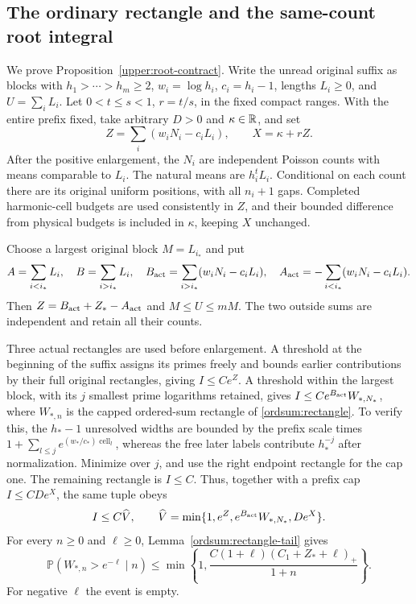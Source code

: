 \subsection{The ordinary rectangle and the same-count root integral}
\label{updetail:ordinary-root}
We prove Proposition~\ref{upper:root-contract}. Write the unread original
suffix as blocks with $h_1>\cdots>h_m\geq2$, $w_i=\log h_i$,
$c_i=h_i-1$, lengths $L_i\geq0$, and $U=\sum_iL_i$.
Let $0<t\leq s<1$, $r=t/s$, in the fixed compact ranges.
With the entire prefix fixed, take arbitrary $D>0$ and $\kappa\in\mathbb R$,
and set
\[
 Z=\sum_i(w_iN_i-c_iL_i),\qquad X=\kappa+rZ.
\]
After the positive enlargement, the $N_i$ are independent Poisson
counts with means comparable to $L_i$. The natural means are
$h_i^tL_i$. Conditional on each count there are its original uniform
positions, with all $n_i+1$ gaps. Completed harmonic-cell budgets are
used consistently in $Z$, and their bounded difference from physical
budgets is included in $\kappa$, keeping $X$ unchanged.

Choose a largest original block $M=L_{i_*}$ and put
\[
 A=\sum_{i<i_*}L_i,\quad B=\sum_{i>i_*}L_i,\quad
 B_{\rm act}=\sum_{i>i_*}(w_iN_i-c_iL_i),\quad
 A_{\rm act}=-\sum_{i<i_*}(w_iN_i-c_iL_i).
\]
Then $Z=B_{\rm act}+Z_*-A_{\rm act}$ and $M\leq U\leq mM$.
The two outside sums are independent and retain all their counts.

Three actual rectangles are used before enlargement. A threshold at
the beginning of the suffix assigns its primes freely and bounds
earlier contributions by their full original rectangles, giving
$I\leq Ce^Z$. A threshold within the largest block, with its $j$
smallest prime logarithms retained, gives
$I\leq Ce^{B_{\rm act}}W_{*,N_*}$, where $W_{*,n}$ is the capped
ordered-sum rectangle of \eqref{ordsum:rectangle}. To verify this,
the $h_*-1$ unresolved widths are bounded by the prefix scale times
$1+\sum_{l\leq j}e^{(w_*/c_*)\operatorname{cell}_l}$, whereas
the free later labels contribute $h_*^{-j}$ after normalization.
Minimize over $j$, and use the right endpoint rectangle for the cap
one. The remaining rectangle is $I\leq C$.
Thus, together with a prefix cap $I\leq CDe^X$, the same tuple obeys
\begin{equation}
 I\leq C\widehat V,\qquad
 \widehat V=\min\{1,e^Z,e^{B_{\rm act}}W_{*,N_*},De^X\}.
 \label{updetail:ordinary-envelope}
\end{equation}
For every $n\geq0$ and $\ell\geq0$,
Lemma~\ref{ordsum:rectangle-tail} gives
\[
 \mathbb P(W_{*,n}>e^{-\ell}\mid n)
 \leq\min\left\{1,
 \frac{C(1+\ell)(C_1+Z_*+\ell)_+}{1+n}\right\}.
\]
For negative $\ell$ the event is empty.

